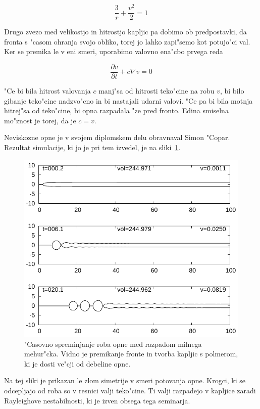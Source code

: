 \documentclass[a4paper,10pt]{article}
\begin{document}
\begin{equation}
 \frac{3}{r} + \frac{v^2}{2} = 1
\end{equation}

Drugo zvezo med velikostjo in hitrostjo kapljic pa dobimo ob predpostavki, da fronta s "casom ohranja svojo obliko, torej jo lahko zapi"semo kot potujo"ci val. Ker se premika le v eni smeri, uporabimo valovno ena"cbo prvega reda

\begin{equation}
 \frac{\partial v}{\partial t} + c \nabla v = 0
\end{equation}

"Ce bi bila hitrost valovanja $c$ manj"sa od hitrosti teko"cine na robu $v$, bi bilo gibanje teko"cine nadzvo"cno in bi nastajali udarni valovi. "Ce pa bi bila motnja hitrej"sa od teko"cine, bi opna razpadala "ze pred fronto. Edina smiselna mo"znost je torej, da je $c=v$. 

Neviskozne opne je v svojem diplomskem delu obravnaval Simon "Copar. Rezultat simulacije, ki jo je pri tem izvedel, je na sliki~\ref{fig:mehurcek-rez-1}. 

\begin{figure}[h]
  \centering
\includegraphics[width=.8\textwidth]{./Slike/mehurcek-rezultat-1}
\caption{"Casovno spreminjanje roba opne med razpadom milnega mehur"cka. Vidno je premikanje fronte in tvorba kapljic s polmerom, ki je dosti ve"cji od debeline opne.~\cite{diploma} }
\label{fig:mehurcek-rez-1}
\end{figure}

Na tej sliki je prikazan le zlom simetrije v smeri potovanja opne. Krogci, ki se odcepljajo od roba so v resnici valji teko"cine. Ti valji razpadejo v kapljice zaradi Rayleighove nestabilnosti, ki je izven obsega tega seminarja. 
\end{document}
